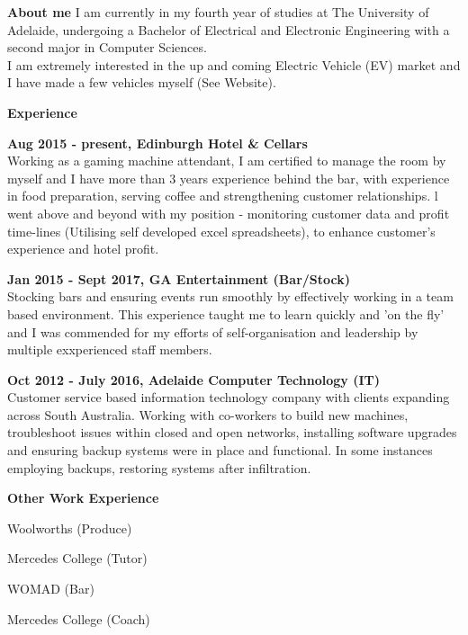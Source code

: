 \documentclass[a4paper,12pt,final]{memoir}
\newenvironment{AboutMe}
	{\ignorespaces\textbf{\color{Maroon} About me}}
	{\vspace{0.5em}\ignorespacesafterend}
\newcommand{\CVSection}[1]
	{\Large\textbf{#1}\par
	\vspace{0.5em}\normalsize\normalfont}
\newcommand{\CVItem}[1]
	{\textbf{\color{Maroon} #1}}
\begin{document}
\begin{AboutMe}
I am currently in my fourth year of studies at The University of Adelaide, undergoing a Bachelor of Electrical and Electronic Engineering with a second major in Computer Sciences. \\
I am extremely interested in the up and coming Electric Vehicle (EV) market and I have made a few vehicles myself (See Website).
\end{AboutMe}

\CVSection{Experience}
\CVItem{Aug 2015 - present, Edinburgh Hotel \& Cellars}\\
Working as a gaming machine attendant, I am certified to manage the room by myself and I have more than 3 years experience behind the bar, with experience in food preparation, serving coffee and strengthening customer relationships. l went above and beyond with my position - monitoring customer data and profit time-lines (Utilising self developed excel spreadsheets), to enhance customer's experience and hotel profit.
\vspace{1em}

\CVItem{Jan 2015 - Sept 2017, GA Entertainment (Bar/Stock)}\\
Stocking bars and ensuring events run smoothly by effectively working in a team based environment. This experience taught me to learn quickly and 'on the fly' and I was commended for my efforts of self-organisation and leadership by multiple exxperienced staff members.
\vspace{1em}

\CVItem{Oct 2012 - July 2016, Adelaide Computer Technology (IT)}\\
Customer service based information technology company with clients expanding across South Australia. Working with co-workers to build new machines, troubleshoot issues within closed and open networks, installing software upgrades and ensuring backup systems were in place and functional. In some instances employing backups, restoring systems after infiltration.
\vspace{1em}

\CVItem{Other Work Experience}\\
\begin{multicols}{2}
\begin{compactitem}[\color{Maroon}$\circ$]
	\item Woolworths (Produce)
	\item Mercedes College (Tutor)
	\item WOMAD (Bar)
	\item Mercedes College (Coach)
\end{compactitem}
\end{multicols}
\vspace{1.5em}
\end{document}
